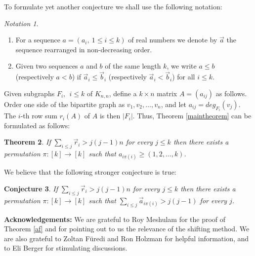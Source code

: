 \documentclass{amsart}
\newtheorem{theorem}{Theorem}[section]
\newtheorem{conjecture}[theorem]{Conjecture}
\theoremstyle{remark}
\newtheorem{notation}[theorem]{Notation}
\begin{document}
To formulate yet another conjecture we shall use the following
notation:



\begin{notation}\hfill
\begin{enumerate}
\item
For a sequence $a=(a_i, ~1 \le i \le k)$ of real numbers we denote by $\overrightarrow{a}$ the sequence rearranged in non-decreasing order.
\item
Given two sequences $a$ and $b$ of the same length $k$, we write $a\le b$ (respectively $a <b$) if $\overrightarrow{a}_i \le \overrightarrow{b}_i$ (respectively $\overrightarrow{a}_i < \overrightarrow{b}_i$) for all $i \le k$.
\end{enumerate}
\end{notation}

Given subgraphs $F_i, ~~i \le k$ of $K_{n,n}$, define a $k \times n$
matrix $A=(a_{ij})$ as follows.  Order one side of the bipartite
graph as $v_1, v_2, \ldots, v_n$, and let $a_{ij}=deg_{F_i}(v_j)$.
The $i$-th row sum $r_i(A)$ of $A$ is then $|F_i|$. Thus, Theorem
\ref{maintheorem} can be formulated as follows:
\begin{theorem} If $\sum_{i \le j}\overrightarrow{r}_i >j(j-1)n$ for every $j \le k$ then there exists a permutation $\pi: [k] \to [k]$ such that $a_{i\pi(i)} \ge (1,2, \ldots,k)$.
\end{theorem}

We believe that the following stronger conjecture is true:

\begin{conjecture} If $\sum_{i \le j}\overrightarrow{r}_i >j(j-1)n$ for every $j \le k$ then there exists a permutation $\pi: [k] \to [k]$ such that
$\sum_{i \le j}\overrightarrow{a}_{i\pi(i)} >j(j-1)$ for every $j$.
\end{conjecture}

{\bf Acknowledgements:} We are grateful to  Roy Meshulam for the
proof of Theorem \ref{af} and for pointing out to us the relevance
of the shifting method. We are also grateful to Zoltan F\"uredi and
Ron Holzman for helpful information, and to Eli Berger for
stimulating discussions.
\end{document}
